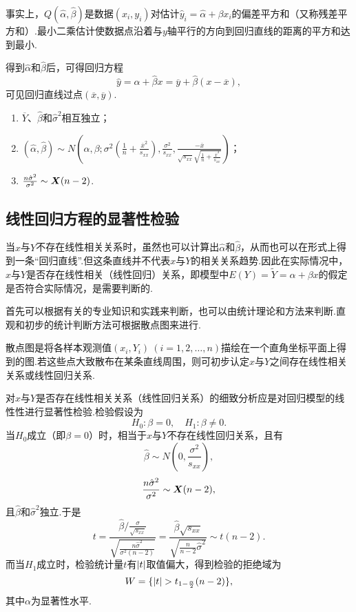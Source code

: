 事实上，\(Q(\hat{\alpha},\hat{\beta})\)是数据\((x_i,y_i)\)对估计\(\hat{y}_i=\hat{\alpha}+\beta x_i\)的偏差平方和（又称残差平方和）.最小二乘估计使数据点沿着与\(y\)轴平行的方向到回归直线的距离的平方和达到最小.

得到\(\hat{\alpha}\)和\(\hat{\beta}\)后，可得回归方程\[
\hat{y} = \hat{\alpha} + \hat{\beta} x
= \overline{y} + \hat{\beta} (x - \overline{x}),
\]可见回归直线过点\((\overline{x},\overline{y})\).

\begin{theorem}
\begin{enumerate}
\item \(\overline{Y}\)、\(\hat{\beta}\)和\(\hat{\sigma}^2\)相互独立；
\item \((\hat{\alpha},\hat{\beta}) \sim N\left(
	\alpha, \beta;
	\sigma^2 \left( \frac{1}{n} + \frac{\overline{x}^2}{s_{xx}} \right),
	\frac{\sigma^2}{s_{xx}},
	\frac{-\overline{x}}{
		\sqrt{s_{xx}} \sqrt{\frac{1}{n} + \frac{\overline{x}^2}{s_{xx}}}
	}
\right)\)；
\item \(\frac{n \hat{\sigma}^2}{\sigma^2} \sim \boldsymbol{X}(n-2)\).
\end{enumerate}
\end{theorem}

\subsection{线性回归方程的显著性检验}
当\(x\)与\(Y\)不存在线性相关关系时，虽然也可以计算出\(\hat{\alpha}\)和\(\hat{\beta}\)，从而也可以在形式上得到一条“回归直线”.但这条直线并不代表\(x\)与\(Y\)的相关关系趋势.因此在实际情况中，\(x\)与\(Y\)是否存在线性相关（线性回归）关系，即模型中\(E(Y) = \widetilde{Y} = \alpha + \beta x\)的假定是否符合实际情况，是需要判断的.

首先可以根据有关的专业知识和实践来判断，也可以由统计理论和方法来判断.直观和初步的统计判断方法可根据散点图来进行.

散点图是将各样本观测值\((x_i,Y_i)\ (i=1,2,\dotsc,n)\)描绘在一个直角坐标平面上得到的图.若这些点大致散布在某条直线周围，则可初步认定\(x\)与\(Y\)之间存在线性相关关系或线性回归关系.

对\(x\)与\(Y\)是否存在线性相关关系（线性回归关系）的细致分析应是对回归模型的线性性进行显著性检验.检验假设为\[
H_0: \beta = 0, \quad H_1: \beta \neq 0.
\]当\(H_0\)成立（即\(\beta = 0\)）时，相当于\(x\)与\(Y\)不存在线性回归关系，且有\[
\hat{\beta} \sim N\left(0, \frac{\sigma^2}{s_{xx}}\right),
\]\[
\frac{n \hat{\sigma}^2}{\sigma^2} \sim \boldsymbol{X}(n-2),
\]且\(\hat{\beta}\)和\(\hat{\sigma}^2\)独立.于是\[
t = \frac{\hat{\beta} / \frac{\sigma}{\sqrt{s_{xx}}}}{\sqrt{\frac{n\hat{\sigma}^2}{\sigma^2(n-2)}}}
= \frac{\hat{\beta} \sqrt{s_{xx}}}{\sqrt{\frac{n}{n-2} \hat{\sigma}^2}}
\sim t(n-2).
\]而当\(H_1\)成立时，检验统计量\(t\)有\(\abs{t}\)取值偏大，得到检验的拒绝域为\[
W = \{ \abs{t} > t_{1-\frac{\alpha}{2}}(n-2) \},
\]其中\(\alpha\)为显著性水平.

